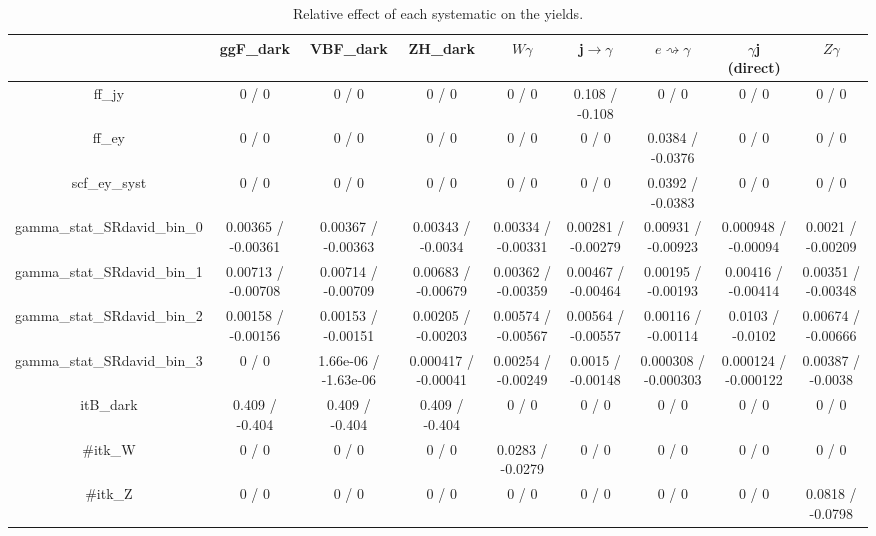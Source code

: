 \documentclass[10pt]{article}
\begin{document}
\begin{table}[htbp]
\begin{center}
\begin{tabular}{|c|c|c|c|c|c|c|c|c|}
\hline 
      & ggF_{dark}      & VBF_{dark}      & ZH_{dark}      & $W\gamma$      & j$\rightarrow\gamma$      & $e\rightsquigarrow\gamma$      & $\gamma$j (direct)      & $Z\gamma$ \\ 
\hline 
  ff_jy & 0 / 0 & 0 / 0 & 0 / 0 & 0 / 0 & 0.108 / -0.108 & 0 / 0 & 0 / 0 & 0 / 0 \\ 
  ff_ey & 0 / 0 & 0 / 0 & 0 / 0 & 0 / 0 & 0 / 0 & 0.0384 / -0.0376 & 0 / 0 & 0 / 0 \\ 
  scf_ey_syst & 0 / 0 & 0 / 0 & 0 / 0 & 0 / 0 & 0 / 0 & 0.0392 / -0.0383 & 0 / 0 & 0 / 0 \\ 
  gamma_stat_SRdavid_bin_0 & 0.00365 / -0.00361 & 0.00367 / -0.00363 & 0.00343 / -0.0034 & 0.00334 / -0.00331 & 0.00281 / -0.00279 & 0.00931 / -0.00923 & 0.000948 / -0.00094 & 0.0021 / -0.00209 \\ 
  gamma_stat_SRdavid_bin_1 & 0.00713 / -0.00708 & 0.00714 / -0.00709 & 0.00683 / -0.00679 & 0.00362 / -0.00359 & 0.00467 / -0.00464 & 0.00195 / -0.00193 & 0.00416 / -0.00414 & 0.00351 / -0.00348 \\ 
  gamma_stat_SRdavid_bin_2 & 0.00158 / -0.00156 & 0.00153 / -0.00151 & 0.00205 / -0.00203 & 0.00574 / -0.00567 & 0.00564 / -0.00557 & 0.00116 / -0.00114 & 0.0103 / -0.0102 & 0.00674 / -0.00666 \\ 
  gamma_stat_SRdavid_bin_3 & 0 / 0 & 1.66e-06 / -1.63e-06 & 0.000417 / -0.00041 & 0.00254 / -0.00249 & 0.0015 / -0.00148 & 0.000308 / -0.000303 & 0.000124 / -0.000122 & 0.00387 / -0.0038 \\ 
  it{B}_{dark} & 0.409 / -0.404 & 0.409 / -0.404 & 0.409 / -0.404 & 0 / 0 & 0 / 0 & 0 / 0 & 0 / 0 & 0 / 0 \\ 
  #it{k_{W}} & 0 / 0 & 0 / 0 & 0 / 0 & 0.0283 / -0.0279 & 0 / 0 & 0 / 0 & 0 / 0 & 0 / 0 \\ 
  #it{k_{Z}} & 0 / 0 & 0 / 0 & 0 / 0 & 0 / 0 & 0 / 0 & 0 / 0 & 0 / 0 & 0.0818 / -0.0798 \\ 
\hline 
\end{tabular} 
\caption{Relative effect of each systematic on the yields.} 
\end{center} 
\end{table} 
\end{document}
